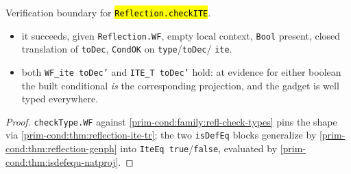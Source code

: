 \begin{theorem}
  \label{prim-cond:thm:reflection-checkite-wf}
  \leanok

   Verification boundary for \hl{\texttt{Reflection.checkITE}}.
  \begin{itemize}
  \item {} it succeeds, given \texttt{Reflection.WF}, empty local context, \texttt{Bool}
    present, closed translation of \texttt{toDec}, \texttt{CondOK} on \texttt{type}/\texttt{toDec}/
    \texttt{ite}.
  \item {} both \texttt{WF\_ite toDec'} and \texttt{ITE\_T toDec'} hold: at evidence for
    either boolean the built conditional \emph{is} the corresponding projection, and the gadget is
    well typed everywhere.
  \end{itemize}
\end{theorem}
\begin{proof}
  \leanok
   \texttt{checkType.WF} against \ref{prim-cond:family:refl-check-types} pins the shape
  via \ref{prim-cond:thm:reflection-ite-tr}; the two \texttt{isDefEq} blocks generalize by
  \ref{prim-cond:thm:reflection-genph} into \texttt{IteEq true}/\texttt{false}, evaluated by
  \ref{prim-cond:thm:isdefequ-natproj}.
\end{proof}

